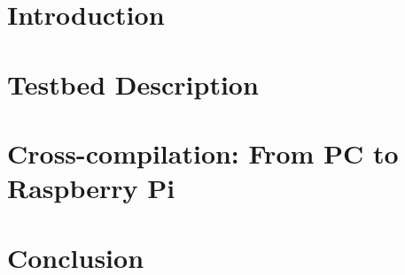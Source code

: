\documentclass[electronics,article,submit,moreauthors,pdftex,10pt,a4paper]{mdpi}
\theoremstyle{mdpi}
\newcounter{ex}
\newcounter{re}
\theoremstyle{mdpidefinition}
\begin{document}
\newcommand*\Reactivatenumber{%
  \lst@AddToHook{OnNewLine}{%
   \let\thelstnumber\origthelstnumber%
   \advance\c@lstnumber\@ne\relax}%
}






\section{Introduction}


\section{Testbed Description}


\section{Cross-compilation: From PC to Raspberry Pi}


\section{Conclusion}


\end{document}
